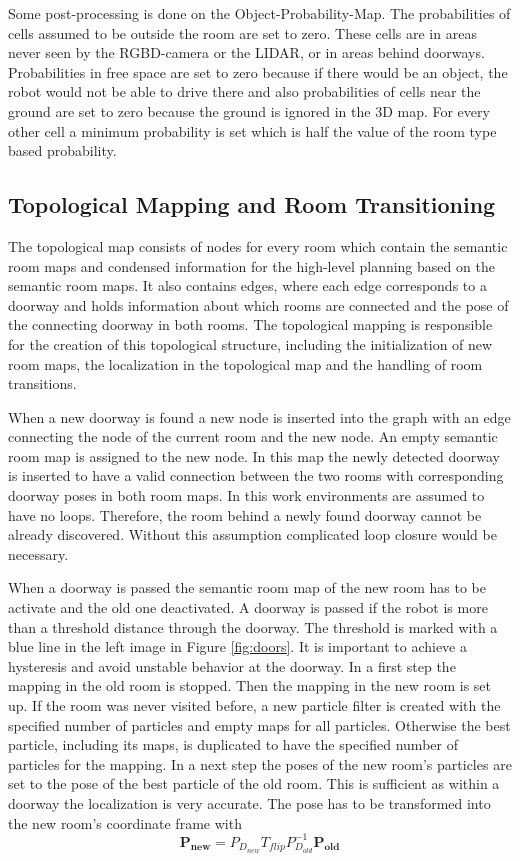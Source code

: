 Some post-processing is done on the Object-Probability-Map. The probabilities of cells assumed to be outside the room are set to zero. These cells are in areas never seen by the RGBD-camera or the LIDAR, or in areas behind doorways. Probabilities in free space are set to zero because if there would be an object, the robot would not be able to drive there and also probabilities of cells near the ground are set to zero because the ground is ignored in the 3D map. For every other cell a minimum probability is set which is half the value of the room type based probability. 

\subsection{Topological Mapping and Room Transitioning} \label{topomapping}

The topological map consists of nodes for every room which contain the semantic room maps and condensed information for the high-level planning based on the semantic room maps. It also contains edges, where each edge corresponds to a doorway and holds information about which rooms are connected and the pose of the connecting doorway in both rooms. The topological mapping is responsible for the creation of this topological structure, including the initialization of new room maps, the localization in the topological map and the handling of room transitions. 

When a new doorway is found a new node is inserted into the graph with an edge connecting the node of the current room and the new node. An empty semantic room map is assigned to the new node. In this map the newly detected doorway is inserted to have a valid connection between the two rooms with corresponding doorway poses in both room maps. In this work environments are assumed to have no loops. Therefore, the room behind a newly found doorway cannot be already discovered. Without this assumption complicated loop closure would be necessary.

When a doorway is passed the semantic room map of the new room has to be activate and the old one deactivated. A doorway is passed if the robot is more than a threshold distance through the doorway. The threshold is marked with a blue line in the left image in Figure \ref{fig:doors}. It is important to achieve a hysteresis and avoid unstable behavior at the doorway. In a first step the mapping in the old room is stopped. Then the mapping in the new room is set up. If the room was never visited before, a new particle filter is created with the specified number of particles and empty maps for all particles. Otherwise the best particle, including its maps, is duplicated to have the specified number of particles for the mapping. In a next step the poses of the new room's particles are set to the pose of the best particle of the old room. This is sufficient as within a doorway the localization is very accurate. The pose has to be transformed into the new room's coordinate frame with
\begin{equation}
 \mathbf{P_{new}}=P_{D_{new}}T_{flip}P_{D_{old}}^{-1}\mathbf{P_{old}}
\end{equation}

